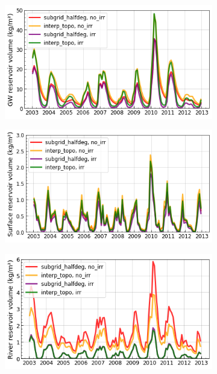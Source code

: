\begin{figure}[htbp]
    \centering
    \begin{subfigure}[b]{0.32\textwidth}
        \caption{}
        \includegraphics[width=\linewidth]{images/eval_halfdeg/time_series/slowr_time_series.png}
    \end{subfigure}
    \begin{subfigure}[b]{0.32\textwidth}
        \caption{}
        \includegraphics[width=\linewidth]{images/eval_halfdeg/time_series/fastr_time_series.png}
    \end{subfigure}
    \begin{subfigure}[b]{0.32\textwidth}
        \caption{}
        \includegraphics[width=\linewidth]{images/eval_halfdeg/time_series/streamr_time_series.png}
    \end{subfigure} \\


\end{figure}
